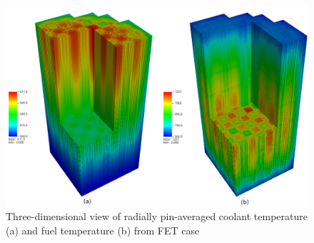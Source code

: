 \begin{figure}
    \centering
    \includegraphics[width=1.0\textwidth]{figs/fuel.pdf}
    \caption[Three-dimensional view of radially pin-averaged coolant and  fuel temperatures]{Three-dimensional view of radially pin-averaged coolant temperature (a) and fuel temperature (b) from FET case}
    \label{fig_49}
\end{figure}